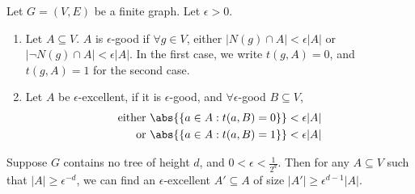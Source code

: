 \documentclass{article}
\begin{document}
\begin{defi}
  Let $G = (V,E)$ be a finite graph. Let $\epsilon>0$.
  \begin{enumerate}[label=(\roman*)]
    \item Let $A \subseteq V$. $A$ is $\epsilon$-good if $\forall g \in V$, either $|N(g) \cap A| < \epsilon |A|$ or $|\neg N(g) \cap A| < \epsilon |A|$.
      In the first case, we write $t(g,A) = 0$, and $t(g,A) = 1$ for the second case.
    \item Let $A$ be $\epsilon$-excellent, if it is $\epsilon$-good, and $\forall \epsilon$-good $B \subseteq V$,
      \begin{align*}
        \text{either } &\abs{\{a \in A : t(a,B) = 0\}} < \epsilon |A| \\
        \text{or } &\abs{\{a \in A : t(a,B) = 1\}} < \epsilon |A|
      \end{align*}
  \end{enumerate}
\end{defi}
\begin{prop}
  Suppose $G$ contains no tree of height $d$, and $0 < \epsilon < \frac{1}{2^d}$.
  Then for any $A \subseteq V$ such that $|A| \geq \epsilon^{-d}$, we can find an $\epsilon$-excellent $A' \subseteq A$ of size $|A'| \geq \epsilon^{d-1} |A|$.
\end{prop}
\end{document}
